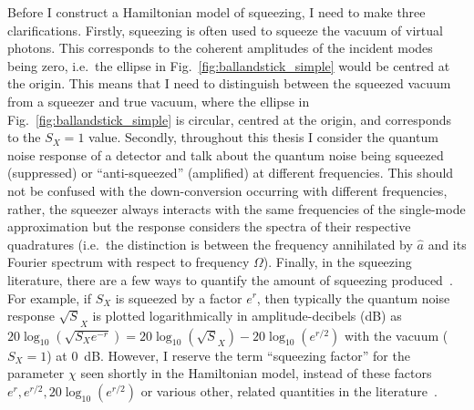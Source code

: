 Before I construct a Hamiltonian model of squeezing, I need to make three clarifications. %
Firstly, squeezing is often used to squeeze the vacuum of virtual photons. %
This corresponds to the coherent amplitudes of the incident modes being zero, i.e.\ the ellipse in Fig.~\ref{fig:ballandstick_simple} would be centred at the origin. This means that I need to distinguish between the squeezed vacuum from a squeezer and true vacuum, where the ellipse in Fig.~\ref{fig:ballandstick_simple} is circular, centred at the origin, and corresponds to the $S_X=1$ value. 
Secondly, throughout this thesis I consider the quantum noise response of a detector and talk about the quantum noise being squeezed (suppressed) or ``anti-squeezed'' (amplified) at different frequencies. This should not be confused with the down-conversion occurring with different frequencies, rather, the squeezer always interacts with the same frequencies of the single-mode approximation but the response considers the spectra of their respective quadratures (i.e.\ the distinction is between the frequency annihilated by ${\hat a}$ and its Fourier spectrum with respect to frequency $\Omega$). Finally, in the squeezing literature, there are a few ways to quantify the amount of squeezing produced~\cite{}. For example, if $S_X$ is squeezed by a factor $e^r$, then typically the quantum noise response $\sqrt S_X$ is plotted logarithmically in amplitude-decibels (dB) as $20 \log_{10}(\sqrt {S_X e^{-r}})=20 \log_{10}(\sqrt S_X) - 20\log_{10}(e^{r/2})$ with the vacuum ($S_X=1$) at $0$~dB. However, I reserve the term ``squeezing factor'' for the parameter $\chi$ seen shortly in the Hamiltonian model, instead of these factors $e^r, e^{r/2}, 20\log_{10}(e^{r/2})$ or various other, related quantities in the literature~\cite{}.



